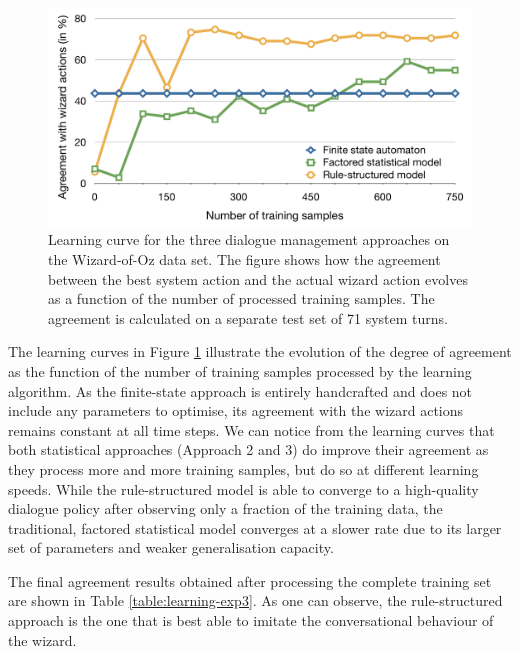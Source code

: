 \begin{figure}[h]
\vspace{3mm}\centering\includegraphics[scale=0.35]{imgs/curve-exp3.pdf}
\caption{Learning curve for the three dialogue management approaches on the Wizard-of-Oz data set.  The figure shows how the agreement between the best system action and the actual wizard action evolves as a function of the number of processed training samples.  The agreement is calculated on a separate test set of 71 system turns.}
\label{fig:curve-exp3}
\end{figure}


The learning curves in Figure \ref{fig:curve-exp3} illustrate the evolution of the degree of agreement as the function of the number of training samples processed by the learning algorithm.  As the finite-state approach is entirely handcrafted and does not include any parameters to optimise, its agreement with the wizard actions remains constant at all time steps. We can notice from the learning curves that both statistical approaches (Approach 2 and 3) do improve their agreement as they process more and more training samples, but do so at different learning speeds.  While the rule-structured model is able to converge to a high-quality dialogue policy after observing only a fraction of the training data, the traditional, factored statistical model converges at a slower rate due to its larger set of parameters and weaker generalisation capacity. 

The final agreement results obtained after processing the complete training set are shown in Table \ref{table:learning-exp3}.  As one can observe, the rule-structured approach is the one that is best able to imitate the conversational behaviour of the wizard. 

